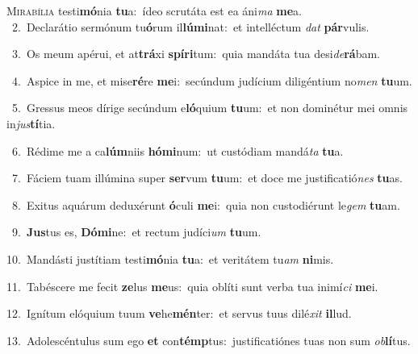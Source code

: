 \lettrine{\initial\textcolor{\initialcolor}{M}}{irabília} testi\-\textbf{mó}\-nia \textbf{tu}\-a:~\star ídeo scrutáta est ea áni\textit{ma} \textbf{me}\-a.\\
{\numbfont\textcolor{\numbcolor}{~2.}}~Declarátio sermónum tu\-\textbf{ó}\-rum il\-\textbf{lú}\-\textbf{mi}nat:~\star et intelléctum \textit{dat} \textbf{pár}\-vulis.\par
{\numbfont\textcolor{\numbcolor}{~3.}}~Os meum apérui, et at\-\textbf{trá}\-xi \textbf{spí}\-\textbf{ri}tum:~\star quia mandáta tua desi\-\textit{de}\-\textbf{rá}bam.\par
{\numbfont\textcolor{\numbcolor}{~4.}}~Aspice in me, et mise\-\textbf{ré}\-re \textbf{me}\-i:~\star secúndum judícium diligéntium no\textit{men} \textbf{tu}\-um.\par
{\numbfont\textcolor{\numbcolor}{~5.}}~Gressus meos dírige secúndum e\-\textbf{ló}\-quium \textbf{tu}\-um:~\star et non dominétur mei omnis in\-\textit{jus}\-\textbf{tí}tia.\par
{\numbfont\textcolor{\numbcolor}{~6.}}~Rédime me a ca\-\textbf{lúm}\-niis \textbf{hó}\-\textbf{mi}num:~\star ut custódiam mandá\textit{ta} \textbf{tu}\-a.\par
{\numbfont\textcolor{\numbcolor}{~7.}}~Fáciem tuam illúmina super \textbf{ser}\-vum \textbf{tu}\-um:~\star et doce me justificatió\textit{nes} \textbf{tu}\-as.\par
{\numbfont\textcolor{\numbcolor}{~8.}}~Exitus aquárum deduxérunt \textbf{ó}\-culi \textbf{me}\-i:~\star quia non custodiérunt le\textit{gem} \textbf{tu}\-am.\par
{\numbfont\textcolor{\numbcolor}{~9.}}~\-\textbf{Jus}\-tus es, \textbf{Dó}\-\textbf{mi}ne:~\star et rectum judíci\textit{um} \textbf{tu}\-um.\par
{\numbfont\textcolor{\numbcolor}{10.}}~Mandásti justítiam testi\-\textbf{mó}\-nia \textbf{tu}\-a:~\star et veritátem tu\textit{am} \textbf{ni}\-mis.\par
{\numbfont\textcolor{\numbcolor}{11.}}~Tabéscere me fecit \textbf{ze}\-lus \textbf{me}\-us:~\star quia oblíti sunt verba tua inimí\textit{ci} \textbf{me}\-i.\par
{\numbfont\textcolor{\numbcolor}{12.}}~Ignítum elóquium tuum \textbf{ve}\-he\-\textbf{mén}\-ter:~\star et servus tuus dilé\textit{xit} \textbf{il}\-lud.\par
{\numbfont\textcolor{\numbcolor}{13.}}~Adolescéntulus sum ego \textbf{et} con\-\textbf{témp}\-tus:~\star justificatiónes tuas non sum \textit{ob}\-\textbf{lí}tus.\par

